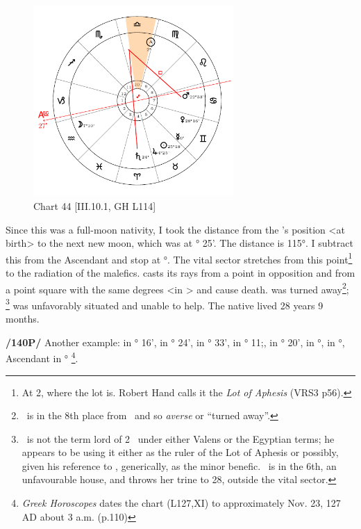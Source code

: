 \clearpage
\begin{figure}
\centering
\vspace{-20pt}
\includegraphics[width=0.68\textwidth]{charts/3_10_1}
\caption{Chart 44 [III.10.1, GH L114]}
\label{fig:chart44}
\end{figure} 

Since this was a full-moon nativity, I took the distance from the \Moon’s position <at birth> to the next new moon, which was at \Gemini\xspace 2° 25'. The distance is 115°. I subtract this from the Ascendant and stop at \Libra\xspace 2°. The vital sector stretches from this point\footnote{At 2\Libra, where the lot is. Robert Hand calls it the \textsl{Lot of Aphesis} (VRS3 p56).} to the radiation of the malefics. \Saturn\xspace casts its rays from a point in opposition and \Mars\xspace from a point square with the same degrees <in \Libra> and cause death. \Jupiter\xspace was turned away\footnote{\Jupiter\, is in the 8th place from \Libra\, and so \textsl{averse} or ``turned away''.}; \Venus\,\footnote{\Venus\, is not the term lord of 2 \Libra\, under either Valens or the Egyptian terms; he appears to be using it either as the ruler of the Lot of Aphesis or possibly, given his reference to \Jupiter, generically, as the minor benefic. \Venus\, is in the 6th, an unfavourable house, and throws her trine to 28\Libra, outside the vital sector.} was unfavorably situated and unable to help. The native lived 28 years 9 months.

\newpage
\textbf{/140P/} Another example: \Sun\xspace in \Sagittarius\xspace 12° 16', \Moon\xspace in \Sagittarius\xspace 17° 24', \Saturn\xspace in \Libra\xspace 11° 33', \Jupiter\xspace in \Gemini\xspace 19° 11;, \Mars\xspace in \Scorpio\xspace 4° 20', \Venus\xspace in \Libra\xspace 26°, \Mercury\xspace in \Scorpio\xspace 27°,
Ascendant in \Libra\xspace 20°
\footnote{\textit{Greek Horoscopes} dates the chart (L127,XI) to approximately Nov. 23, 127 AD about 3 a.m. (p.110)}.

